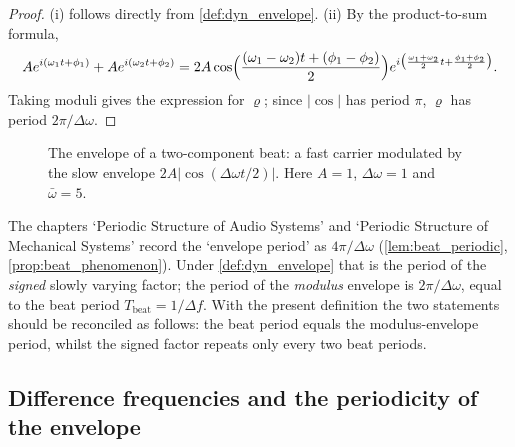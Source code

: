 \begin{proof}
(i) follows directly from \cref{def:dyn_envelope}. (ii) By the product-to-sum formula,
\[
Ae^{i(\omega_1t+\phi_1)}+Ae^{i(\omega_2t+\phi_2)}
=2A\cos\Bigl(\frac{(\omega_1-\omega_2)t+(\phi_1-\phi_2)}{2}\Bigr)e^{i\bigl(\frac{\omega_1+\omega_2}{2}t+\frac{\phi_1+\phi_2}{2}\bigr)}.
\]
Taking moduli gives the expression for $\varrho$; since $|\cos|$ has period $\pi$, $\varrho$ has period $2\pi/\Delta\omega$.
\end{proof}

\begin{figure}[htbp]
\centering
{}
\caption{The envelope of a two-component beat: a fast carrier modulated by the slow envelope $2A|\cos(\Delta\omega t/2)|$. Here $A=1$, $\Delta\omega=1$ and $\bar\omega=5$.}
\label{fig:dyn_envelope_beat}
\end{figure}

\begin{remark}\label{rem:dyn_envelope_beat_convention}
The chapters `Periodic Structure of Audio Systems' and `Periodic Structure of Mechanical Systems' record the `envelope period' as $4\pi/\Delta\omega$ (\cref{lem:beat_periodic}, \cref{prop:beat_phenomenon}). Under \cref{def:dyn_envelope} that is the period of the \emph{signed} slowly varying factor; the period of the \emph{modulus} envelope is $2\pi/\Delta\omega$, equal to the beat period $T_{\text{beat}}=1/\Delta f$. With the present definition the two statements should be reconciled as follows: the beat period equals the modulus-envelope period, whilst the signed factor repeats only every two beat periods.
\end{remark}

\subsection{Difference frequencies and the periodicity of the envelope}

